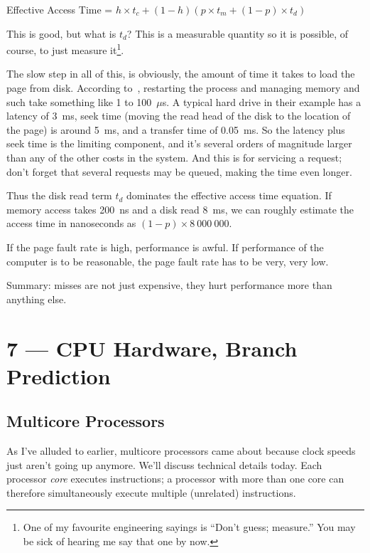 \documentclass[a4paper]{report}
\begin{document}
\begin{center}
	Effective Access Time = $ h \times t_{c} + (1 - h) ( p \times t_{m} + (1 - p) \times t_{d})$
\end{center}

This is good, but what is $t_{d}$? This is a measurable quantity so it is possible, of course, to just measure it\footnote{One of my favourite engineering sayings is ``Don't guess; measure.'' You may be sick of hearing me say that one by now.}.

The slow step in all of this, is obviously, the amount of time it takes to load the page from disk. According to~\cite{osc}, restarting the process and managing memory and such take something like 1 to 100~$\mu$s. A typical hard drive in their example has a latency of 3~ms, seek time (moving the read head of the disk to the location of the page) is around 5~ms, and a transfer time of 0.05~ms. So the latency plus seek time is the limiting component, and it's several orders of magnitude larger than any of the other costs in the system. And this is for servicing a request; don't forget that several requests may be queued, making the time even longer.

Thus the disk read term $t_{d}$ dominates the effective access time equation. If memory access takes 200~ns and a disk read 8~ms, we can roughly estimate the access time in nanoseconds as $(1-p) \times 8~000~000$. 

If the page fault rate is high, performance is awful. If performance of the computer is to be reasonable, the page fault rate has to be very, very low.

Summary: misses are not just expensive, they hurt performance more than anything else.










\chapter*{7 --- CPU Hardware, Branch Prediction}


\section*{Multicore Processors}
As I've alluded to earlier, multicore processors came about because
clock speeds just aren't going up anymore. We'll discuss technical
details today. Each processor \emph{core} executes instructions; a processor with more than one core can therefore simultaneously execute multiple
(unrelated) instructions. 
\end{document}
